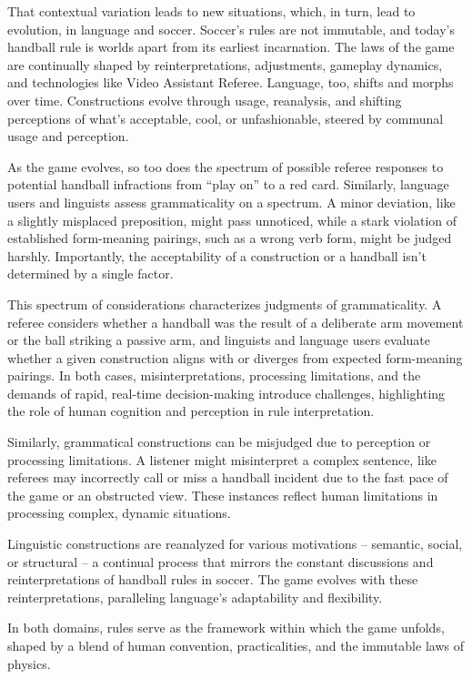 That contextual variation leads to new situations, which, in turn, lead to evolution, in language and soccer. Soccer's rules are not immutable, and today's handball rule is worlds apart from its earliest incarnation. The laws of the game are continually shaped by reinterpretations, adjustments, gameplay dynamics, and technologies like Video Assistant Referee. Language, too, shifts and morphs over time. Constructions evolve through usage, reanalysis, and shifting perceptions of what's acceptable, cool, or unfashionable, steered by communal usage and perception.

As the game evolves, so too does the spectrum of possible referee responses to potential handball infractions from ``play on'' to a red card. Similarly, language users and linguists assess grammaticality on a spectrum. A minor deviation, like a slightly misplaced preposition, might pass unnoticed, while a stark violation of established form-meaning pairings, such as a wrong verb form, might be judged harshly. Importantly, the acceptability of a construction or a handball isn't determined by a single factor.

This spectrum of considerations characterizes judgments of grammaticality. A referee considers whether a handball was the result of a deliberate arm movement or the ball striking a passive arm, and linguists and language users evaluate whether a given construction aligns with or diverges from expected form-meaning pairings. In both cases, misinterpretations, processing limitations, and the demands of rapid, real-time decision-making introduce challenges,  highlighting the role of human cognition and perception in rule interpretation.

Similarly, grammatical constructions can be misjudged due to perception or processing limitations. A listener might misinterpret a complex sentence, like referees may incorrectly call or miss a handball incident due to the fast pace of the game or an obstructed view. These instances reflect human limitations in processing complex, dynamic situations.

Linguistic constructions are reanalyzed for various motivations -- semantic, social, or structural -- a continual process that mirrors the constant discussions and reinterpretations of handball rules in soccer. The game evolves with these reinterpretations, paralleling language's adaptability and flexibility.

In both domains, rules serve as the framework within which the game unfolds, shaped by a blend of human convention, practicalities, and the immutable laws of physics.

